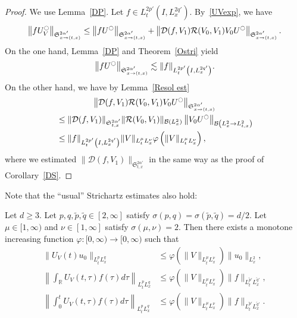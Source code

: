 \documentclass[10pt,a4paper]{amsart}
\providecommand{\No}[1]{\left\| #1 \right\|}
\newcommand{\CB}{\mathcal{B}}
\newcommand{\CD}{\mathcal{D}}
\newcommand{\CR}{\mathcal{R}}
\newcommand{\FS}{\mathfrak{S}}
\newcommand{\al}{\alpha}
\newcommand{\ph}{\varphi}
\newcommand{\ta}{\tau}
\newcommand{\si}{\sigma}
\newcommand{\wt}{\widetilde}
\renewcommand{\No}[1]{\left\| #1 \right\|}
\newcommand{\I}{\infty}
\newcommand{\tx}{{t,x}}
\newcommand{\Sxtx}{{\FS^{2\al'}_{x \to (t,x)}}}
\newcommand{\R}{\mathbb{R}}
\newcommand{\oc}{\ocircle}
\newcommand{\ls}{\lesssim}
\begin{document}
\begin{proof}
We use Lemma~\ref{DP}. Let $f \in L^{2p'}_t(I,L^{2q'}_x)$. By~\eqref{UVexp}, we have
\begin{align}
\left\|f U_V^\oc\right\|_{\Sxtx} \le \left\|f U^\oc\right\|_{\Sxtx} + \left\|\CD(f,V_1) \CR(V_0,V_1) V_0 U^\oc\right\|_{\Sxtx}.
\end{align}
On the one hand, Lemma~\ref{DP} and Theorem~\ref{Ostri} yield
\begin{align}
\left\|f U^\oc\right\|_{\Sxtx} \ls \|f\|_{L^{2p'}_t\left(I,L^{2q'}_x\right)}.
\end{align}
On the other hand, we have by Lemma~\ref{Resol est}
\begin{multline}
\left\|\CD(f,V_1) \CR(V_0,V_1) V_0 U^\oc\right\|_{\Sxtx} 
\\
\begin{aligned}
&\le \|\CD(f,V_1)\|_{\FS^{2\al'}_\tx} \|\CR(V_0,V_1)\|_{\CB\left(L^2_x\right)} \left\|V_0 U^\oc\right\|_{\CB\left(L^2_x \to L^2_\tx\right)} \\
&\le \|f\|_{L^{2p'}_t\left(I,L^{2q'}_x\right)} \|V\|_{L^\mu_t L^\nu_x} \ph\left(\|V\|_{L^\mu_t L^\nu_x}\right),
\end{aligned}
\end{multline}
where we estimated $\|\CD(f,V_1)\|_{\FS^{2\al'}_\tx}$ in the same way as the proof of Corollary~\ref{DS}.
\end{proof}

Note that the ``usual'' Strichartz estimates also hold:

\begin{lemm}\label{UVStri}
Let $d \geq 3$. Let $p,q,\wt{p},\wt{q} \in [2, \I]$ satisfy $\si(p,q) = \si(\wt{p},\wt{q})=d/2$. Let $\mu \in [1, \I)$ and $\nu \in [1, \I]$ satisfy $\si(\mu,\nu) = 2$. Then there exists a monotone increasing function $\ph:[0,\I) \to [0, \I)$ such that
\begin{align}
\|U_V(t)u_0\|_{L^p_tL^q_x}
&\leq \ph\left(\|V\|_{L^\mu_t L^\nu_x}\right) \|u_0\|_{L^2_x}, \label{UVStri1}
\\
\No{ \int_\R U_V(t,\ta)f(\ta) d\ta }_{L^p_tL^q_x}
&\leq \ph\left(\|V\|_{L^\mu_t L^\nu_x}\right) \|f\|_{L^{\wt{p}'}_t L^{\wt{q}'}_x}, \label{UVStri2}
\\
\No{ \int_0^t U_V(t,\ta)f(\ta) d\ta}_{L^p_tL^q_x}
&\leq \ph\left(\|V\|_{L^\mu_t L^\nu_x}\right) \|f\|_{L^{\wt{p}'}_t L^{\wt{q}'}_x}. \label{UVStri3}
\end{align}
\end{lemm}
\end{document}
